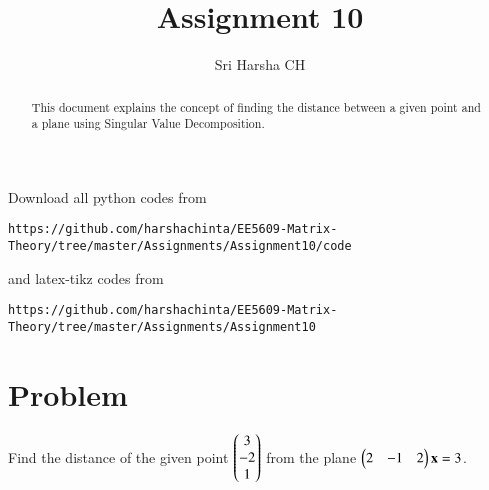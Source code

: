 \documentclass[journal,12pt,twocolumn]{IEEEtran}
\begin{document}
\renewcommand{\thefigure}{\theproblem}

\def\putbox#1#2#3{\makebox[0in][l]{\makebox[#1][l]{}\raisebox{\baselineskip}[0in][0in]{\raisebox{#2}[0in][0in]{#3}}}}
     \def\rightbox#1{\makebox[0in][r]{#1}}
     \def\centbox#1{\makebox[0in]{#1}}
     \def\topbox#1{\raisebox{-\baselineskip}[0in][0in]{#1}}
     \def\midbox#1{\raisebox{-0.5\baselineskip}[0in][0in]{#1}}
\vspace{3cm}
\title{Assignment 10}
\author{Sri Harsha CH}

\maketitle
\newpage

\bigskip
\renewcommand{\thefigure}{\theenumi}
\renewcommand{\thetable}{\theenumi}

\begin{abstract}
This document explains the concept of finding the distance between a given point and a plane using Singular Value Decomposition.
\end{abstract}

Download all python codes from 
\begin{lstlisting}
https://github.com/harshachinta/EE5609-Matrix-Theory/tree/master/Assignments/Assignment10/code
\end{lstlisting}
%
and latex-tikz codes from 
%
\begin{lstlisting}
https://github.com/harshachinta/EE5609-Matrix-Theory/tree/master/Assignments/Assignment10
\end{lstlisting}
%
\section{Problem}
Find the distance of the given point $\begin{pmatrix}3\\-2\\1\end{pmatrix}$ from the plane $\begin{pmatrix}2&-1&2\end{pmatrix}\mathbf{x} = 3$.
\end{document}
